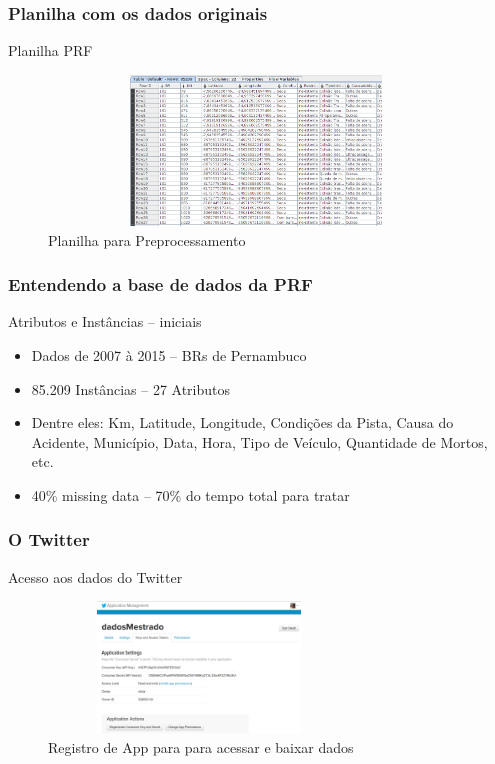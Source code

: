 \documentclass[11pt]{beamer}
\begin{document}

\begin{frame}\frametitle{ Planilha com os dados originais}
	\transboxin[duration=1, direction=25]	
	\begin{block}{ Planilha PRF}
		\begin{figure}[!ht]
			\centering %
			\caption{Planilha para Preprocessamento}
			\includegraphics[width=110mm, height=40mm]{Figuras/BigData/PlanilhaPRF.png}
		\end{figure}
	\end{block}
\end{frame}


\begin{frame}
	\frametitle{ Entendendo a base de dados da PRF}
	\begin{exampleblock}{ Atributos e Instâncias -- iniciais}
		\begin{itemize}
			\item Dados de 2007 à 2015 -- BRs de Pernambuco
			\pause
			\item 85.209 Instâncias -- 27 Atributos
			\pause
			\item Dentre eles: Km, Latitude, Longitude, Condições da Pista, Causa do Acidente, Município, Data, Hora, Tipo de Veículo, Quantidade de Mortos, etc.
			\pause
			\item 40\% missing data -- 70\% do tempo total para tratar
		\end{itemize}
	\end{exampleblock}
\end{frame}

\begin{frame}\frametitle{ O Twitter}
	\begin{block}{ Acesso aos dados do Twitter}
		\begin{figure}[!ht]
			\centering %
			\caption{Registro de App para para acessar e baixar dados}
			\includegraphics[width=80mm, height=35mm]{Figuras/BigData/appTweeter.png}
		\end{figure}
	\end{block}
\end{frame}
\end{document}
